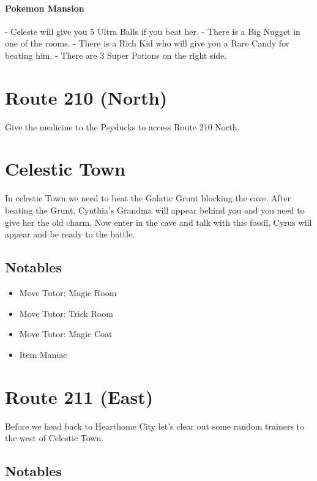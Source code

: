 \documentclass[11pt]{article}
\begin{document}
\paragraph{Pokemon Mansion}
- Celeste will give you 5 Ultra Balls if you beat her.
- There is a Big Nugget in one of the rooms.
- There is a Rich Kid who will give you a Rare Candy for beating him.
- There are 3 Super Potions on the right side.




\section{Route 210 (North)}\label{sec:route-210-(north)}
Give the medicine to the Psyducks to access Route 210 North.

\section{Celestic Town}\label{sec:celestic-town}
In celestic Town we need to beat the Galatic Grunt blocking the cave.
After beating the Grunt, Cynthia's Grandma will appear behind you
and you need to give her the old charm.
Now enter in the cave and talk with this fossil, Cyrus will appear and be ready to the battle.

\subsection{Notables}\label{subsec:notables-celestic}

\begin{itemize}
    \item Move Tutor: Magic Room
    \item Move Tutor: Trick Room
    \item Move Tutor: Magic Coat
    \item Item Maniac
\end{itemize}

\section{Route 211 (East)}\label{sec:Route_211_(East)}
Before we head back to Hearthome City let's clear out some random trainers to
the west of Celestic Town.

\subsection{Notables}\label{subsec:notables-route-211-east}
\end{document}
